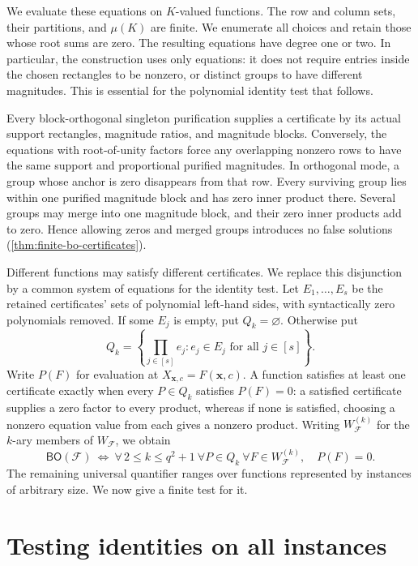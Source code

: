 \documentclass[11pt,letterpaper,onecolumn]{article}
\theoremstyle{plain}
\theoremstyle{definition}
\theoremstyle{remark}
\newcommand{\cF}{\mathcal F}
\newcommand{\BO}{\mathsf{BO}}
\begin{document}
We evaluate these equations on $K$-valued functions.
The row and column sets, their partitions, and $\mu(K)$ are finite.
We enumerate all choices and retain those whose root sums are zero.
The resulting equations have degree one or two.
In particular, the construction uses only equations: it does not
require entries inside the chosen rectangles to be nonzero, or distinct
groups to have different magnitudes. This is essential for the
polynomial identity test that follows.

Every block-orthogonal singleton purification supplies a certificate
by its actual support rectangles, magnitude ratios, and magnitude
blocks. Conversely, the equations with root-of-unity factors force any
overlapping nonzero rows to have the same support and proportional
purified magnitudes. In orthogonal mode, a group whose anchor is zero
disappears from that row. Every surviving group lies within one
purified magnitude block and has zero inner product there. Several
groups may merge into one magnitude block, and their zero inner
products add to zero. Hence allowing zeros and merged groups introduces
no false solutions (\cref{thm:finite-bo-certificates}).

Different functions may satisfy different certificates. We replace this
disjunction by a common system of equations for the identity test.
Let $E_1,\ldots,E_s$ be the retained certificates' sets of polynomial
left-hand sides, with syntactically zero polynomials removed. If some $E_j$ is empty, put
$Q_k=\varnothing$. Otherwise put
\[
 Q_k=\left\{\prod_{j\in[s]}e_j:e_j\in E_j\text{ for all }j\in[s]\right\}.
\]
Write $P(F)$ for evaluation at $X_{\mathbf x,c}=F(\mathbf x,c)$.
A function satisfies at least one certificate exactly when every
$P\in Q_k$ satisfies $P(F)=0$: a satisfied certificate supplies a zero
factor to every product, whereas if none is satisfied, choosing a
nonzero equation value from each gives a nonzero product.
Writing $W_{\cF}^{(k)}$ for the $k$-ary members of $W_{\cF}$, we obtain
\begin{equation}
 \BO(\cF)\ \Longleftrightarrow\
 \forall\,2\le k\le q^2+1\ \forall P\in Q_k\ \forall F\in W_{\cF}^{(k)},
 \quad P(F)=0.
 \label{s:eq:bo-reduction}
\end{equation}
The remaining universal quantifier ranges over functions represented by
instances of arbitrary size. We now give a finite test for it.

\section{Testing identities on all instances}
\label{s:sec:identities}
\end{document}
